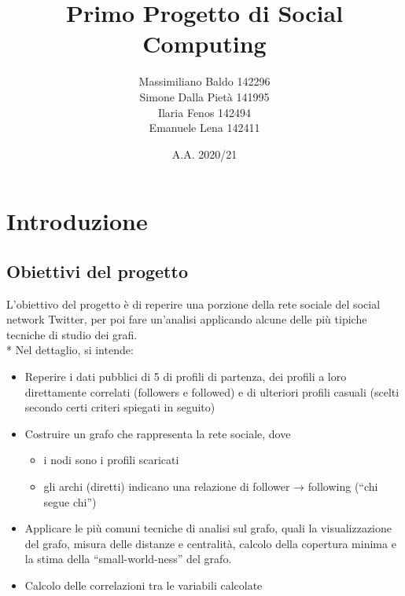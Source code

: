 \documentclass[a4paper, 12pt, twoside]{article}
\title{Primo Progetto di Social Computing}
\author{Massimiliano Baldo 142296\\
        Simone Dalla Pietà 141995\\
        Ilaria Fenos 142494\\
        Emanuele Lena 142411
        }
\date{A.A. 2020/21}
\begin{document}
\maketitle
\tableofcontents
\thispagestyle{empty}  %
\newpage               %
\setcounter{page}{1}   %

\section{Introduzione} \label{sec:intro}


\subsection{Obiettivi del progetto}
L’obiettivo del progetto è di reperire una porzione della rete sociale del social network  Twitter, per poi fare un’analisi applicando alcune delle più tipiche tecniche di studio dei grafi. \\*
Nel dettaglio, si intende:
\begin{itemize}
    \item Reperire i dati pubblici di 5 di profili di partenza, dei profili a loro direttamente correlati (followers e followed) e di ulteriori profili casuali (scelti secondo certi criteri spiegati in seguito)
    \item Costruire un grafo che rappresenta la rete sociale, dove
    \begin{itemize}
        \item i nodi sono i profili scaricati
        \item gli archi (diretti) indicano una relazione di follower → following (“chi segue chi”)
    \end{itemize}
    \item Applicare le più comuni tecniche di analisi sul grafo, quali la visualizzazione del grafo, misura delle distanze e centralità, calcolo della copertura minima e la stima della “small-world-ness” del grafo.
\item Calcolo delle correlazioni tra le variabili calcolate
\end{itemize} %
\end{document}
